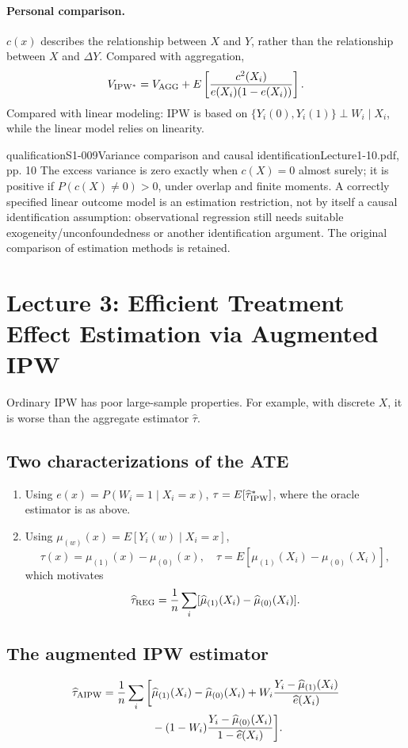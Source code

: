 \paragraph{Personal comparison.}
$c(x)$ describes the relationship between $X$ and $Y$, rather than the relationship between $X$ and $\Delta Y$. Compared with aggregation,
\[
V_{\rm IPW^*}=V_{\rm AGG}+E\left[\frac{c^2(X_i)}{e(X_i)(1-e(X_i))}\right].
\]
 Compared with linear modeling: IPW is based on $\{Y_i(0),Y_i(1)\}\perp W_i\mid X_i$, while the linear model relies on linearity.
\begin{reviewnote}{qualification}{S1-009}{Variance comparison and causal identification}{Lecture1-10.pdf, pp. 10}
The excess variance is zero exactly when $c(X)=0$ almost surely; it is positive if $P(c(X)\ne0)>0$, under overlap and finite moments. A correctly specified linear outcome model is an estimation restriction, not by itself a causal identification assumption: observational regression still needs suitable exogeneity/unconfoundedness or another identification argument. The original comparison of estimation methods is retained.
\end{reviewnote}



\section{Lecture 3: Efficient Treatment Effect Estimation via Augmented IPW}
Ordinary IPW has poor large-sample properties. For example, with discrete $X$, it is worse than the aggregate estimator $\widehat\tau$.
\subsection{Two characterizations of the ATE}
\begin{enumerate}
\item Using $e(x)=P(W_i=1\mid X_i=x)$, $\tau=E[\widehat\tau^*_{\rm IPW}]$, where the oracle estimator is as above.
\item Using $\mu_{(w)}(x)=E[Y_i(w)\mid X_i=x]$,
\[
\tau(x)=\mu_{(1)}(x)-\mu_{(0)}(x),\quad
\tau=E[\mu_{(1)}(X_i)-\mu_{(0)}(X_i)],
\]
which motivates
\[
\widehat\tau_{\rm REG}=\frac1n\sum_i[\widehat\mu_{(1)}(X_i)-\widehat\mu_{(0)}(X_i)].
\]
\end{enumerate}
\subsection{The augmented IPW estimator}
\begin{align*}
\widehat\tau_{\rm AIPW}=\frac1n\sum_i\bigg[&\widehat\mu_{(1)}(X_i)-\widehat\mu_{(0)}(X_i)
+W_i\frac{Y_i-\widehat\mu_{(1)}(X_i)}{\widehat e(X_i)}\\
&-(1-W_i)\frac{Y_i-\widehat\mu_{(0)}(X_i)}{1-\widehat e(X_i)}\bigg].
\end{align*}
